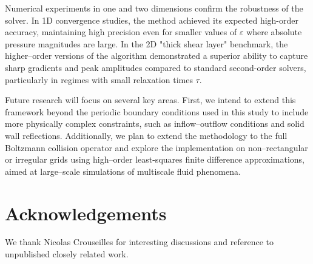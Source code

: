 \documentclass[final,11pt]{siamart251216}
\numberwithin{equation}{section}
\theoremstyle{definition}
\theoremstyle{remark}
\begin{document}
Numerical experiments in one and two dimensions confirm the robustness of the solver. In 1D convergence studies, the method achieved its expected high-order accuracy, maintaining high precision even for smaller values of $\varepsilon$ where absolute pressure magnitudes are large. In the 2D "thick shear layer" benchmark, the higher--order versions of the algorithm demonstrated a superior ability to capture sharp gradients and peak amplitudes compared to standard second-order solvers, particularly in regimes with small relaxation times $\tau$. 

Future research will focus on several key areas. First, we intend to extend this framework beyond the periodic boundary conditions used in this study to include more physically complex constraints, such as inflow--outflow conditions and solid wall reflections. 
Additionally, we plan to extend the methodology to the full Boltzmann collision operator and explore the implementation on non--rectangular or irregular grids using high--order least-squares finite difference approximations, aimed at large--scale simulations of multiscale fluid phenomena.


\section*{Acknowledgements}  We thank Nicolas Crouseilles for interesting discussions and reference to unpublished closely related work.






\end{document}
